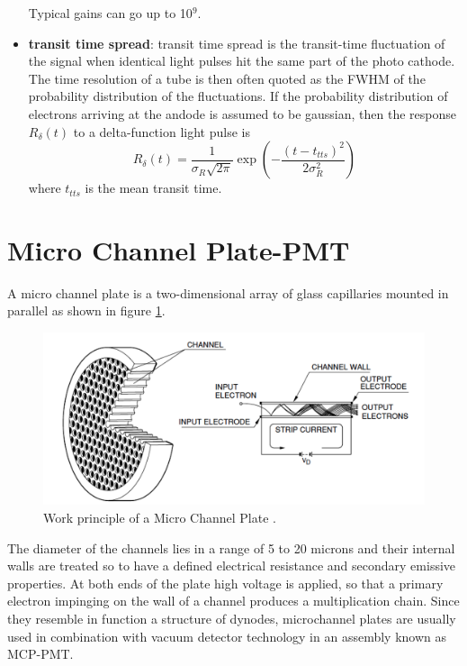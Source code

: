 \begin{itemize}
\begin{equation}
\end{equation}
Typical gains can go up to 10$^{9}$.
\item \textbf{transit time spread}: transit time spread is the transit-time fluctuation of the signal when identical light pulses hit the same part of the photo cathode. The time resolution of a tube is then often quoted as the FWHM of the probability distribution of the fluctuations.
If the probability distribution of electrons arriving at the andode is assumed to be gaussian, then the response $R_{\delta}(t)$ to a delta-function light pulse is
\begin{equation}
R_{\delta}(t) = \frac{1}{\sigma _{R}\sqrt {2\pi}}\exp{\left( -\frac{(t-t_{tts})^2}{2\sigma _{R}^2}\right)}
\end{equation}
where $t_{tts}$ is the mean transit time.
\end{itemize}

\section{Micro Channel Plate-PMT}
A micro channel plate is a two-dimensional array of glass capillaries mounted in parallel as shown in figure \ref{fig:MCP_schematics}.
\begin{figure}[htbp]
\begin{center}
\includegraphics[width=12cm]{../Pictures/Chapter_3/MCP_plate.png}
\end{center}
\caption[MCP principle]{Work principle of a Micro Channel Plate \cite{Hama2006}.}
\label{fig:MCP_schematics}
\end{figure}
The diameter of the channels lies in a range of 5 to 20 microns and their internal walls are treated so to have a defined electrical resistance and secondary emissive properties.
At both ends of the plate high voltage is applied, so that a primary electron impinging on the wall of a channel produces a multiplication chain.
Since they resemble in function a structure of dynodes, microchannel plates are usually used in combination with vacuum detector technology in an assembly known as MCP-PMT.

